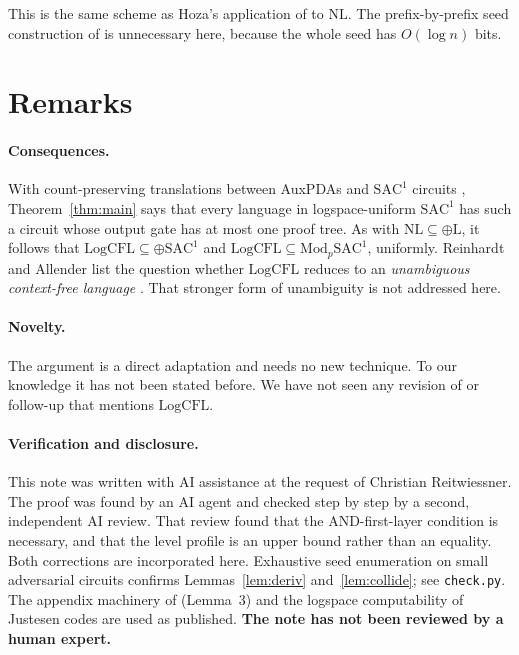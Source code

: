 \documentclass[11pt,letterpaper]{article}
\theoremstyle{definition}
\theoremstyle{remark}
\newcommand{\LogCFL}{\mathrm{LogCFL}}
\begin{document}
This is the same scheme as Hoza's application of \cite{RA} to $\mathrm{NL}$. The
prefix-by-prefix seed construction of \cite[Algorithm~1]{vMP} is unnecessary here,
because the whole seed has $O(\log n)$ bits.

\section{Remarks}

\paragraph{Consequences.} With count-preserving translations between AuxPDAs
and $\mathrm{SAC}^1$ circuits \cite{Vinay,vMP}, Theorem~\ref{thm:main} says that
every language in logspace-uniform $\mathrm{SAC}^1$ has such a circuit whose output gate
has at most one proof tree. As with $\mathrm{NL}\subseteq\oplus\mathrm{L}$,
it follows that $\LogCFL\subseteq\oplus\mathrm{SAC}^1$ and
$\LogCFL\subseteq\mathrm{Mod}_p\mathrm{SAC}^1$, uniformly. Reinhardt and
Allender list the question whether $\LogCFL$ reduces to an
\emph{unambiguous context-free language} \cite[\S4]{RA}. That stronger form of
unambiguity is not addressed here.

\paragraph{Novelty.} The argument is a direct adaptation and needs no new technique.
To our knowledge it has not been stated before. We have not seen any revision of
\cite{Hoza} or follow-up that mentions $\LogCFL$.

\paragraph{Verification and disclosure.} This note was written with AI assistance at
the request of Christian Reitwiessner. The proof was found by an AI agent and
checked step by step by a second, independent AI review. That review found that the
AND-first-layer condition is necessary, and that the level profile is an upper bound
rather than an equality. Both corrections are incorporated here. Exhaustive seed
enumeration on small adversarial circuits confirms Lemmas~\ref{lem:deriv}
and~\ref{lem:collide}; see \texttt{check.py}. The appendix machinery of
\cite{vMP} (Lemma~3) and the logspace computability of Justesen codes are used as
published. \textbf{The note has not been reviewed by a human expert.}
\end{document}
